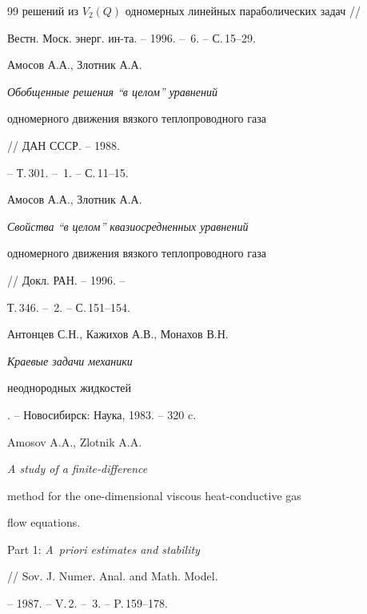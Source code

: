 \begin{thebibliography}{99}
{решений из $V_2(Q)$ одномерных линейных параболических задач} //


Вестн. Моск. энерг. ин-та. -- 1996. -- \No\,6. -- С.\,15--29.




Амосов А.А., Злотник А.А. {\em Обобщенные решения ``в целом'' уравнений


одномерного движения вязкого теплопроводного газа} // ДАН СССР. -- 1988.


-- Т.\,301. -- \No\,1. -- С.\,11--15.




Амосов А.А., Злотник А.А. {\em Свойства ``в целом'' квазиосредненных уравнений


одномерного движения вязкого теплопроводного газа} // Докл. РАН. -- 1996. --


Т.\,346. -- \No\,2. -- С.\,151--154.




Антонцев С.Н., Кажихов А.В., Монахов В.Н. {\em Краевые задачи механики


неоднородных жидкостей}. -- Новосибирск: Наука, 1983. -- 320 c.




Amosov A.A., Zlotnik A.A. {\em A study of a finite-difference


method for the one-dimensional viscous heat-conductive gas


flow equations.} Part 1: {\em A~priori estimates and stability}


// Sov. J. Numer. Anal. and Math. Model.


-- 1987. -- V.\,2. -- \No\,3. -- P.\,159--178.





\end{thebibliography}





\vskip 0.5cm












\label{end}





